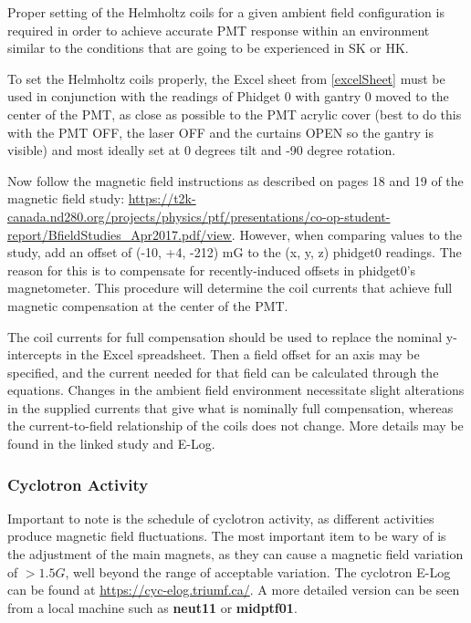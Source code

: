 \documentclass[twoside,letterpaper]{refart}
\begin{document}
Proper setting of the Helmholtz coils for a given ambient field configuration is required in order to achieve accurate PMT response within an environment similar to the conditions that are going to be experienced in SK or HK.  

To set the Helmholtz coils properly, the Excel sheet from \ref{excelSheet} must be used in conjunction with the readings of Phidget 0 with gantry 0 moved to the center of the PMT, as close as possible to the PMT acrylic cover (best to do this with the PMT OFF, the laser OFF and the curtains OPEN so the gantry is visible) and most ideally set at 0 degrees tilt and -90 degree rotation.

Now follow the magnetic field instructions as described on pages 18 and 19 of the magnetic field study: \url{https://t2k-canada.nd280.org/projects/physics/ptf/presentations/co-op-student-report/BfieldStudies_Apr2017.pdf/view}. However, when comparing values to the study, add an offset of (-10, +4, -212) mG to the (x, y, z) phidget0 readings. The reason for this is to compensate for recently-induced offsets in phidget0's magnetometer. This procedure will determine the coil currents that achieve full magnetic compensation at the center of the PMT.

The coil currents for full compensation should be used to replace the nominal y-intercepts in the Excel spreadsheet. Then a field offset for an axis may be specified, and the current needed for that field can be calculated through the equations. Changes in the ambient field environment necessitate slight alterations in the supplied currents that give what is nominally full compensation, whereas the current-to-field relationship of the coils does not change. More details may be found in the linked study and E-Log.

\subsubsection{Cyclotron Activity}

Important to note is the schedule of cyclotron activity, as different activities produce magnetic field fluctuations.  The most important item to be wary of is the adjustment of the main magnets, as they can cause a magnetic field variation of $>1.5G$, well beyond the range of acceptable variation. The cyclotron E-Log can be found at \url{https://cyc-elog.triumf.ca/}.  A more detailed version can be seen from a local machine such as \textbf{neut11} or \textbf{midptf01}.
\end{document}
